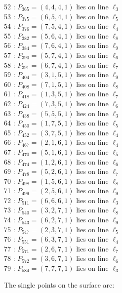 \documentclass{article}
\begin{document}
{\begin{multicols}{2}
52 : $P_{365}=( 4, 4, 4, 1 )$ lies on line $\ell_{3}$\\
53 : $P_{375}=( 6, 5, 4, 1 )$ lies on line $\ell_{5}$\\
54 : $P_{376}=( 7, 5, 4, 1 )$ lies on line $\ell_{4}$\\
55 : $P_{382}=( 5, 6, 4, 1 )$ lies on line $\ell_{8}$\\
56 : $P_{384}=( 7, 6, 4, 1 )$ lies on line $\ell_{9}$\\
57 : $P_{390}=( 5, 7, 4, 1 )$ lies on line $\ell_{6}$\\
58 : $P_{391}=( 6, 7, 4, 1 )$ lies on line $\ell_{7}$\\
59 : $P_{404}=( 3, 1, 5, 1 )$ lies on line $\ell_{9}$\\
60 : $P_{408}=( 7, 1, 5, 1 )$ lies on line $\ell_{8}$\\
61 : $P_{418}=( 1, 3, 5, 1 )$ lies on line $\ell_{7}$\\
62 : $P_{424}=( 7, 3, 5, 1 )$ lies on line $\ell_{6}$\\
63 : $P_{438}=( 5, 5, 5, 1 )$ lies on line $\ell_{3}$\\
64 : $P_{450}=( 1, 7, 5, 1 )$ lies on line $\ell_{5}$\\
65 : $P_{452}=( 3, 7, 5, 1 )$ lies on line $\ell_{4}$\\
66 : $P_{467}=( 2, 1, 6, 1 )$ lies on line $\ell_{4}$\\
67 : $P_{470}=( 5, 1, 6, 1 )$ lies on line $\ell_{5}$\\
68 : $P_{474}=( 1, 2, 6, 1 )$ lies on line $\ell_{6}$\\
69 : $P_{478}=( 5, 2, 6, 1 )$ lies on line $\ell_{7}$\\
70 : $P_{498}=( 1, 5, 6, 1 )$ lies on line $\ell_{8}$\\
71 : $P_{499}=( 2, 5, 6, 1 )$ lies on line $\ell_{9}$\\
72 : $P_{511}=( 6, 6, 6, 1 )$ lies on line $\ell_{3}$\\
73 : $P_{540}=( 3, 2, 7, 1 )$ lies on line $\ell_{8}$\\
74 : $P_{543}=( 6, 2, 7, 1 )$ lies on line $\ell_{9}$\\
75 : $P_{547}=( 2, 3, 7, 1 )$ lies on line $\ell_{5}$\\
76 : $P_{551}=( 6, 3, 7, 1 )$ lies on line $\ell_{4}$\\
77 : $P_{571}=( 2, 6, 7, 1 )$ lies on line $\ell_{7}$\\
78 : $P_{572}=( 3, 6, 7, 1 )$ lies on line $\ell_{6}$\\
79 : $P_{584}=( 7, 7, 7, 1 )$ lies on line $\ell_{3}$\\
\end{multicols}
The single points on the surface are:\\
}
\end{document}

